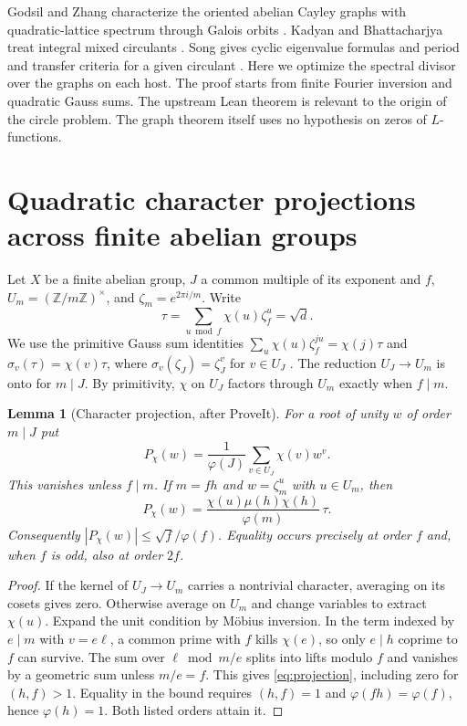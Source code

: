 \documentclass[11pt]{article}
\newtheorem{lemma}[theorem]{Lemma}
\newcommand{\Z}{\mathbb Z}\newcommand{\Q}{\mathbb Q}\newcommand{\C}{\mathbb C}
\begin{document}
Godsil and Zhang characterize the oriented abelian Cayley graphs with quadratic-lattice spectrum through Galois orbits \cite[Theorem 8.1]{gz}. Kadyan and Bhattacharjya treat integral mixed circulants \cite{kb}. Song gives cyclic eigenvalue formulas and period and transfer criteria for a given circulant \cite{song}. Here we optimize the spectral divisor over the graphs on each host. The proof starts from finite Fourier inversion and quadratic Gauss sums. The upstream Lean theorem is relevant to the origin of the circle problem. The graph theorem itself uses no hypothesis on zeros of $L$-functions.

\section{Quadratic character projections across finite abelian groups}
Let $X$ be a finite abelian group, $J$ a common multiple of its exponent and $f$, $U_m=(\Z/m\Z)^\times$, and $\zeta_m=e^{2\pi i/m}$. Write
\[
       \tau=\sum_{u\bmod f}\chi(u)\zeta_f^u=\sqrt d.
\]
We use the primitive Gauss sum identities $\sum_u\chi(u)\zeta_f^{ju}=\chi(j)\tau$ and $\sigma_v(\tau)=\chi(v)\tau$, where $\sigma_v(\zeta_J)=\zeta_J^v$ for $v\in U_J$ \cite{davenport}. The reduction $U_J\to U_m$ is onto for $m\mid J$. By primitivity, $\chi$ on $U_J$ factors through $U_m$ exactly when $f\mid m$.

\begin{lemma}[Character projection, after ProveIt]\label{lem:projection}
For a root of unity $w$ of order $m\mid J$ put
\[
 P_\chi(w)=\frac{1}{\varphi(J)}\sum_{v\in U_J}\chi(v)w^v .
\]
This vanishes unless $f\mid m$. If $m=fh$ and $w=\zeta_m^u$ with $u\in U_m$, then
\begin{equation}
 P_\chi(w)=\frac{\chi(u)\mu(h)\chi(h)}{\varphi(m)}\,\tau .
 \label{eq:projection}
\end{equation}
Consequently $|P_\chi(w)|\le\sqrt f/\varphi(f)$. Equality occurs precisely at order $f$ and, when $f$ is odd, also at order $2f$.
\end{lemma}
\begin{proof}
If the kernel of $U_J\to U_m$ carries a nontrivial character, averaging on its cosets gives zero. Otherwise average on $U_m$ and change variables to extract $\chi(u)$. Expand the unit condition by M\"obius inversion. In the term indexed by $e\mid m$ with $v=e\ell$, a common prime with $f$ kills $\chi(e)$, so only $e\mid h$ coprime to $f$ can survive. The sum over $\ell\bmod m/e$ splits into lifts modulo $f$ and vanishes by a geometric sum unless $m/e=f$. This gives \eqref{eq:projection}, including zero for $(h,f)>1$. Equality in the bound requires $(h,f)=1$ and $\varphi(fh)=\varphi(f)$, hence $\varphi(h)=1$. Both listed orders attain it.
\end{proof}
\end{document}
